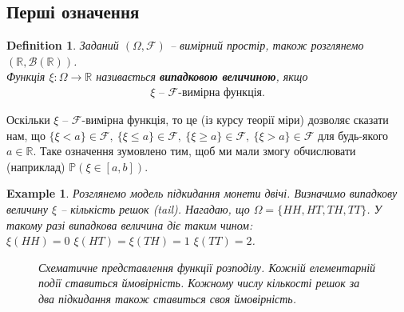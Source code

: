 \documentclass[a4paper, 10pt]{article}
\theoremstyle{theoremdd}
\newtheorem{definition}[theorem]{Definition}
\newtheorem{example}[theorem]{Example}
\begin{document}
\subsection{Перші означення}
\begin{definition}
Заданий $(\Omega,\mathcal{F})$ -- вимірний простір, також розглянемо $(\mathbb{R}, \mathcal{B}(\mathbb{R}))$.\\
Функція $\xi \colon \Omega \to \mathbb{R}$ називається \textbf{випадковою величиною}, якщо
\begin{align*}
\xi \text{ -- $\mathcal{F}$-вимірна функція.}
\end{align*}
\end{definition}
\noindent
Оскільки $\xi$ -- $\mathcal{F}$-вимірна функція, то це (із курсу теорії міри) дозволяє сказати нам, що $\{\xi < a\} \in \mathcal{F},\ \{\xi \leq a \} \in \mathcal{F},\ \{\xi \geq a\} \in \mathcal{F},\ \{\xi > a \} \in \mathcal{F}$ для будь-якого $a \in \mathbb{R}$. Таке означення зумовлено тим, щоб ми мали змогу обчислювати (наприклад) $\mathbb{P}(\xi \in [a,b])$.

\begin{example}
Розглянемо модель підкидання монети двічі. Визначимо випадкову величину $\xi$ -- кількість решок (tail). Нагадаю, що $\Omega = \{HH,HT,TH,TT\}$. У такому разі випадкова величина діє таким чином:\\
$\xi(HH) = 0$ \qquad $\xi(HT) = \xi(TH) = 1$ \qquad $\xi(TT) = 2$.
\begin{figure}[H]
\centering
{}
\caption*{Схематичне представлення функції розподілу. Кожній елементарній події ставиться ймовірність. Кожному числу кількості решок за два підкидання також ставиться своя ймовірність.}
\end{figure}
\end{example}
\end{document}
